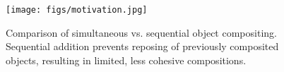 \begin{figure}[t]
    \centering
    \texttt{[image: figs/motivation.jpg]}
    \caption{Comparison of simultaneous vs. sequential object compositing. Sequential addition prevents reposing of previously composited objects, resulting in limited, less cohesive compositions.} %

    \label{fig:motivation}
    \vspace{-6mm}
\end{figure}


